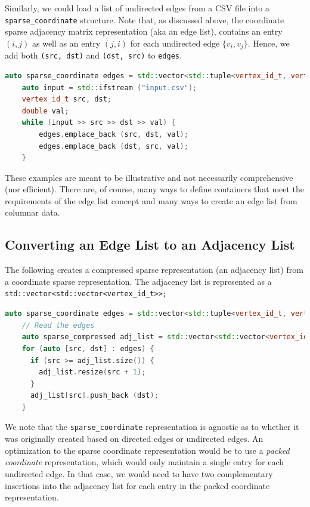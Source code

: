 Similarly, we could load a list of undirected edges from a CSV file into a 
\lstinline{sparse_coordinate} structure.  
Note that, as discussed above, the coordinate sparse adjacency matrix representation (aka an edge list), contains an entry $(i, j)$ as well as an entry $(j, i)$ for each undirected edge $\{ v_i, v_j \}$.  Hence, we add both \lstinline{(src, dst)} and  \lstinline{(dst, src)} to \lstinline{edges}.
\begin{lstlisting}[language=C++]
    auto sparse_coordinate edges = std::vector<std::tuple<vertex_id_t, vertex_id_t, double> edges;
    auto input = std::ifstream ("input.csv");
    vertex_id_t src, dst;
    double val;
    while (input >> src >> dst >> val) {
        edges.emplace_back (src, dst, val);
        edges.emplace_back (dst, src, val);
    }
\end{lstlisting}

These examples are meant to be illustrative and not necessarily
comprehensive (nor efficient).
There are, of course, many ways to define containers that meet the
requirements of the edge list concept and many ways to
create an edge list from columnar data.

\subsection{Converting an Edge List to an Adjacency List}

The following creates a compressed sparse representation (an adjacency list) from a coordinate sparse representation.  The adjacency list is represented as 
a \lstinline{std::vector<std::vector<vertex_id_t>>;}
\begin{lstlisting}[language=C++]
    auto sparse_coordinate edges = std::vector<std::tuple<vertex_id_t, vertex_id_t>;
    // Read the edges
    auto sparse_compressed adj_list = std::vector<std::vector<vertex_id_t>>;
    for (auto [src, dst] : edges) {
      if (src >= adj_list.size()) {
        adj_list.resize(src + 1);
      }
      adj_list[src].push_back (dst);
    }
\end{lstlisting}

We note that the \lstinline{sparse_coordinate} representation is agnostic as to whether it was originally created based on directed edges or undirected edges.  An optimization to the sparse coordinate representation would be to use a \emph{packed coordinate} representation, which would only maintain a single entry for each undirected edge.  In that case, we would need to have two complementary insertions into the adjacency list for each entry in the packed coordinate representation.

